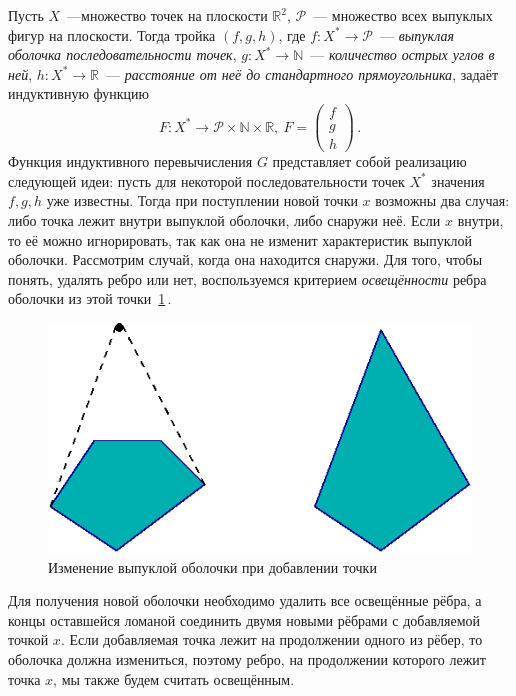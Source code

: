 Пусть $X$~---множество точек на плоскости $\mathbb{R}^2$, $\mathcal{P}$~---
множество всех выпуклых фигур на плоскости. Тогда тройка $\left(f,g,h\right)$, где
$f\colon X^* \rightarrow \mathcal{P}$~---
\emph{выпуклая оболочка последовательности точек},
$g\colon X^* \rightarrow \mathbb{N}$~--- \emph{количество острых углов в ней},
$h\colon X^* \rightarrow \mathbb{R}$~---
\emph{расстояние от неё до стандартного прямоугольника}, задаёт индуктивную
функцию $$F\colon X^* \rightarrow \mathcal{P} \times \mathbb{N} \times
\mathbb{R},~F = \begin{pmatrix}f\\ g\\ h\end{pmatrix}\,.$$
Функция индуктивного перевычисления $G$ представляет собой реализацию следующей
идеи: пусть для некоторой последовательности точек $X^*$ значения $f,g,h$ уже известны.
Тогда при поступлении новой точки $x$ возможны два случая:
либо точка лежит внутри выпуклой оболочки, либо снаружи неё. Если $x$ внутри,
то её можно игнорировать, так как она не изменит характеристик выпуклой оболочки.
Рассмотрим случай, когда она находится снаружи. Для того, чтобы понять, удалять ребро или нет, воспользуемся критерием \emph{освещённости} ребра оболочки из этой точки~\ref{fig:conv_light}\,.
\begin{figure}[ht!]
\begin{center}
\includegraphics[scale=0.6]{images/conv_a_2}
\end{center}
\vspace*{-8mm}
\caption{Изменение выпуклой оболочки при добавлении точки}\label{fig:conv_light}
\end{figure}

Для получения новой оболочки необходимо удалить все освещённые рёбра, а концы
оставшейся ломаной соединить двумя новыми рёбрами с добавляемой точкой $x$.
Если добавляемая точка лежит на продолжении одного из рёбер, то оболочка должна
измениться, поэтому ребро, на продолжении которого лежит точка $x$, мы также будем
считать освещённым.

